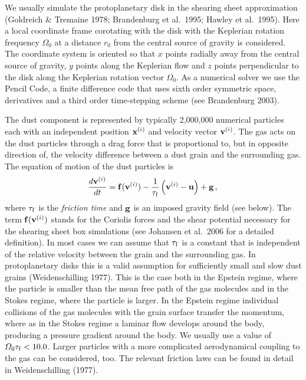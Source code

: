 We usually simulate the protoplanetary disk in the shearing sheet
approximation (Goldreich \& Tremaine 1978; Brandenburg et al.\ 1995; Hawley
et al.\ 1995). Here a local coordinate frame corotating with the disk with
the Keplerian rotation frequency $\varOmega_0$ at a distance $r_0$ from the
central source of gravity is considered. The coordinate system is oriented
so that $x$ points radially away from the central source of gravity, $y$
points along the Keplerian flow and $z$ points perpendicular to the disk
along the Keplerian rotation vector {\boldmath $\varOmega_0$}. As a
numerical solver we use the Pencil Code, a finite difference code that uses
sixth order symmetric space, derivatives and a third order time-stepping
scheme (see Brandenburg 2003).

The dust component is represented by typically 2,000,000 numerical particles
each with an independent position ${\bf{x}}^{(i)}$ and velocity vector ${\bf
v}^{(i)}$. The gas acts on the dust particles through a drag force that is
proportional to, but in opposite direction of, the velocity difference
between a dust grain and the surrounding gas. The equation of motion of the
dust particles is
\begin{equation}
 \frac{d {\bf v}^{(i)}}{d t} = {\bf f}({\bf v}^{(i)})
      - \frac{1}{\tau_{\rm f}} \left({\bf v}^{(i)}-{\bf u}\right) + {\bf g}\, ,
  \label{eq:eqmotp}\\
\end{equation}
where $\tau_{\rm f}$ is the {\it friction time} and $\bf{g}$ is an imposed
gravity field (see below). The term ${\bf f}({\bf v}^{(i)})$ stands for the
Coriolis forces and the shear potential necessary for the shearing sheet box
simulations (see Johansen et al.\ 2006 for a detailed definition).  In most
cases we can assume that $\tau_{\rm f}$ is a constant that is independent of
the relative velocity between the grain and the surrounding gas. In
protoplanetary disks this is a valid assumption for sufficiently small and
slow dust grains (Weidenschilling 1977). This is the case both in the
Epstein regime, where the particle is smaller than the mean free path of the
gas molecules and in the Stokes regime, where the particle is larger.  In
the Epstein regime individual collisions of the gas molecules with the grain
surface transfer the momentum, where as in the Stokes regime a laminar flow
develops around the body, producing a pressure gradient around the body. We
usually use a value of $\varOmega_0 \tau_{\rm f} < 10.0$.  Larger particles
with a more complicated aerodynamical coupling to the gas can be considered,
too. The relevant friction laws can be found in detail in Weidenschilling
(1977).

